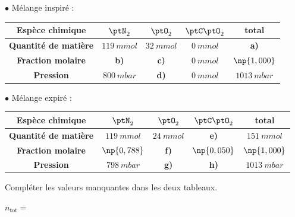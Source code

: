 $\bullet$ Mélange inspiré :
\begin{center}
\renewcommand{\arraystretch}{1.3}
\begin{tabular}{ |c|c|c|c|c| } 
 \hline
 \textbf{Espèce chimique} & $\ptN_2$ & $\ptO_2$ & $\ptC\ptO_2$ & total\\
 \hline 
 \textbf{Quantité de matière} & $\SI{119}{mmol}$ & $\SI{32}{mmol}$ & $\SI{0}{mmol}$ & \textbf{a)} \\
 \hline 
 \textbf{Fraction molaire} & \textbf{b)} & \textbf{c)} & $\SI{0}{mmol}$ & $\np{1,000}$ \\
 \hline 
 \textbf{Pression} & $\SI{800}{mbar}$ & \textbf{d)} & $\SI{0}{mmol}$ & $\SI{1013}{mbar}$ \\
 \hline
\end{tabular}
\renewcommand{\arraystretch}{1}
\end{center}

$\bullet$ Mélange expiré :
\begin{center}
\renewcommand{\arraystretch}{1.3}
\begin{tabular}{ |c|c|c|c|c| } 
 \hline
 \textbf{Espèce chimique} & $\ptN_2$ & $\ptO_2$ & $\ptC\ptO_2$ & total\\
 \hline 
 \textbf{Quantité de matière} & $\SI{119}{mmol}$ & $\SI{24}{mmol}$ & \textbf{e)} & $\SI{151}{mmol}$ \\
 \hline 
 \textbf{Fraction molaire} & $\np{0,788}$ & \textbf{f)} & $\np{0,050}$ & $\np{1,000}$ \\
 \hline 
 \textbf{Pression} & $\SI{798}{mbar}$ & \textbf{g)} & \textbf{h)}  & $\SI{1013}{mbar}$ \\
 \hline
\end{tabular}
\renewcommand{\arraystretch}{1}
\end{center}

Compléter les valeurs manquantes dans les deux tableaux.

\smallskip

\debutEntrainement



\begin{enonce}
$n_\mathrm{tot}=$
\end{enonce}



